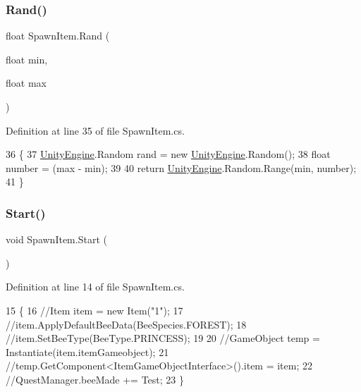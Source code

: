 \subsubsection{\texorpdfstring{Rand()}{Rand()}}
{\footnotesize\ttfamily float Spawn\+Item.\+Rand (\begin{DoxyParamCaption}\item[{float}]{min,  }\item[{float}]{max }\end{DoxyParamCaption})\hspace{0.3cm}{\ttfamily [private]}}



Definition at line 35 of file Spawn\+Item.\+cs.


\begin{DoxyCode}
36     \{
37         \hyperlink{namespace_unity_engine}{UnityEngine}.Random rand = \textcolor{keyword}{new} \hyperlink{namespace_unity_engine}{UnityEngine}.Random();
38         \textcolor{keywordtype}{float} number = (max - min);
39 
40         \textcolor{keywordflow}{return} \hyperlink{namespace_unity_engine}{UnityEngine}.Random.Range(min, number);
41     \}
\end{DoxyCode}
\mbox{\label{class_spawn_item_abce0af54142e123b9c4aae4fd6f4656c}} 
\subsubsection{\texorpdfstring{Start()}{Start()}}
{\footnotesize\ttfamily void Spawn\+Item.\+Start (\begin{DoxyParamCaption}{ }\end{DoxyParamCaption})\hspace{0.3cm}{\ttfamily [private]}}



Definition at line 14 of file Spawn\+Item.\+cs.


\begin{DoxyCode}
15     \{
16         \textcolor{comment}{//Item item = new Item("1");}
17         \textcolor{comment}{//item.ApplyDefaultBeeData(BeeSpecies.FOREST);}
18         \textcolor{comment}{//item.SetBeeType(BeeType.PRINCESS);}
19 
20         \textcolor{comment}{//GameObject temp = Instantiate(item.itemGameobject);}
21         \textcolor{comment}{//temp.GetComponent<ItemGameObjectInterface>().item = item;}
22         \textcolor{comment}{//QuestManager.beeMade += Test;}
23     \}
\end{DoxyCode}
\mbox{\label{class_spawn_item_a0bcf186dd80f62583686eb240f2107ca}} 
